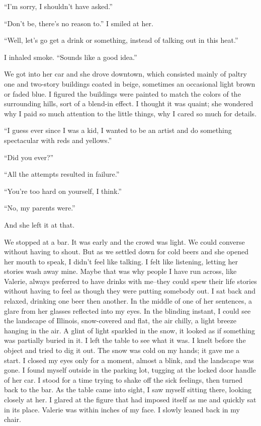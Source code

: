 \documentclass[
]{article}
\begin{document}
``I'm sorry, I shouldn't have asked.''

``Don't be, there's no reason to.'' I smiled at her.

``Well, let's go get a drink or something, instead of talking out in
this heat.''

I inhaled smoke. ``Sounds like a good idea.''

We got into her car and she drove downtown, which consisted mainly of
paltry one and two-story buildings coated in beige, sometimes an
occasional light brown or faded blue. I figured the buildings were
painted to match the colors of the surrounding hills, sort of a blend-in
effect. I thought it was quaint; she wondered why I paid so much
attention to the little things, why I cared so much for details.

``I guess ever since I was a kid, I wanted to be an artist and do
something spectacular with reds and yellows.''

``Did you ever?''

``All the attempts resulted in failure.''

``You're too hard on yourself, I think.''

``No, my parents were.''

And she left it at that.

We stopped at a bar. It was early and the crowd was light. We could
converse without having to shout. But as we settled down for cold beers
and she opened her mouth to speak, I didn't feel like talking. I felt
like listening, letting her stories wash away mine. Maybe that was why
people I have run across, like Valerie, always preferred to have drinks
with me--they could spew their life stories without having to feel as
though they were putting somebody out. I sat back and relaxed, drinking
one beer then another. In the middle of one of her sentences, a glare
from her glasses reflected into my eyes. In the blinding instant, I
could see the landscape of Illinois, snow-covered and flat, the air
chilly, a light breeze hanging in the air. A glint of light sparkled in
the snow, it looked as if something was partially buried in it. I left
the table to see what it was. I knelt before the object and tried to dig
it out. The snow was cold on my hands; it gave me a start. I closed my
eyes only for a moment, almost a blink, and the landscape was gone. I
found myself outside in the parking lot, tugging at the locked door
handle of her car. I stood for a time trying to shake off the sick
feelings, then turned back to the bar. As the table came into sight, I
saw myself sitting there, looking closely at her. I glared at the figure
that had imposed itself as me and quickly sat in its place. Valerie was
within inches of my face. I slowly leaned back in my chair.
\end{document}

